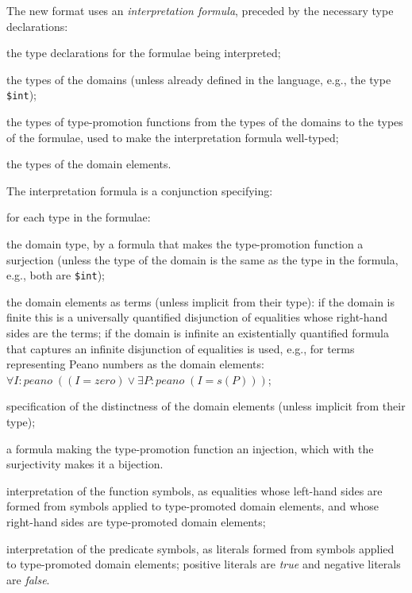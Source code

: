 \documentclass[letterpaper]{article}
\newcommand{\smalltt}[1]{\small \texttt{#1}}
\newenvironment{packed_itemize}{
\vspace*{-0.2em}
\begin{itemize}
\setlength{\partopsep}{0pt}
\setlength{\itemsep}{1pt}
\setlength{\parskip}{0pt}
\setlength{\parsep}{0pt}
}{\end{itemize}}
\begin{document}
The new format uses an {\em interpretation formula}, preceded by the necessary type 
declarations:
\begin{packed_itemize}
\item the type declarations for the formulae being interpreted;
\item the types of the domains (unless already defined in the language, e.g., the type
      {\smalltt{\$int}});
\item the types of type-promotion functions from the types of the domains to the types 
      of the formulae, used to make the interpretation formula well-typed;
\item the types of the domain elements.
\end{packed_itemize}
The interpretation formula is a conjunction specifying: 
\begin{packed_itemize}
\item for each type in the formulae:
      \begin{packed_itemize}
      \item the domain type, by a formula that makes the type-promotion function a surjection 
            (unless the type of the domain is the same as the type in the formula, e.g., both 
            are {\smalltt{\$int}});
      \item the domain elements as terms (unless implicit from their type): if the domain is
            finite this is a universally quantified disjunction of equalities whose right-hand 
            sides are the terms; if the domain is infinite an existentially quantified formula 
            that captures an infinite disjunction of equalities is used, e.g., for terms 
            representing Peano numbers as the domain elements:\\
            \hspace*{0.5cm}$\forall I{:}peano\;((I = zero) \vee \exists P{:}peano\;(I = s(P)))$;
      \item specification of the distinctness of the domain elements (unless implicit from their
            type);
      \item a formula making the type-promotion function an injection,
            which with the surjectivity makes it a bijection.
      \end{packed_itemize}
\item interpretation of the function symbols, as equalities whose left-hand sides are 
      formed from symbols applied to type-promoted domain elements, and whose right-hand sides 
      are type-promoted domain elements;
\item interpretation of the predicate symbols, as literals formed from symbols applied
      to type-promoted domain elements; positive literals are {\em true} and negative literals 
      are {\em false}.
\end{packed_itemize}
\end{document}
